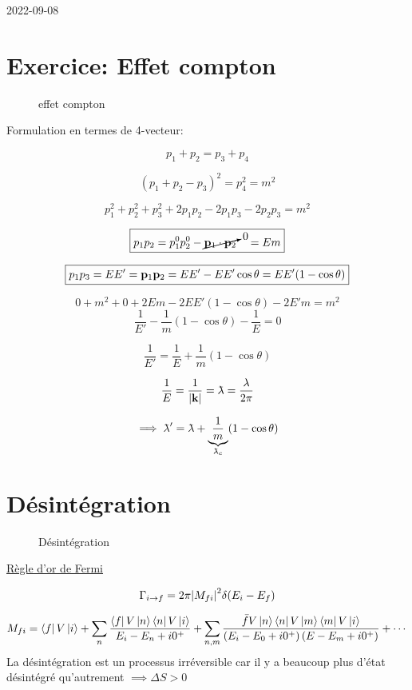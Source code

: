 


2022-09-08

\section*{Exercice: Effet compton}


\begin{figure}[ht]
    \centering
    \caption{effet compton}
    \label{fig:effet-compton}
\end{figure}



Formulation en termes de 4-vecteur:


$$p_1 + p_2 = p_3 + p_4$$ 


$$\left( p_1 + p_2 - p_3 \right)^2 = p_4^{2}= m^2$$ 

$$p_1^{2}+p_2^{2}+p_3^{2}+ 2p_1 p_2 - 2 p_1 p_3 - 2 p_2 p_3 = m^2$$ 

$$\boxed{p_1 p_2 = p_1^{0}p_2^{0}- \cancelto{0}{\vb{p}_1\cdot \vb{p}_2}\quad= Em}$$ 

$$\boxed{p_1 p_3 = E E' = \vb{p}_1 \vb{p}_2 = EE' - EE'\cos\theta = EE'(1-\cos\theta) }$$ 

$$0 + m^{2} + 0 +2Em - 2EE'(1-\cos\theta) -2 E'm = m^2$$ 
$$\frac{1}{E'} - \frac{1}{m} (1-\cos\theta) - \frac{1}{E} = 0$$ 

$$\frac{1}{E'} = \frac{1}{E} + \frac{1}{m} (1-\cos\theta)$$ 

$$\frac{1}{E} = \frac{1}{\abs{\vb{k}}} = \lambdabar = \frac{\lambda}{2\pi}  $$ 

$$\implies \lambdabar' = \lambdabar + \underbrace{\frac{1}{m}}_{\lambdabar_c}  (1-\cos\theta)$$ 


\section*{Désintégration}


\begin{figure}[ht]
    \centering
    \caption{Désintégration}
    \label{fig:désintégration}
\end{figure}
\pagebreak
\underline{Règle d'or de Fermi}  

$$\Gamma_{i\to f} = 2\pi \abs{M_{fi} }^{2}\delta(E_i-E_f)$$ 


$$M_{fi} = \bra{f}V\ket{i} + \sum_n \frac{\bra{f}V \ket{n}\bra{n}V\ket{i}}{E_i -E_n +i0^+} + \sum_{n,m} \frac{\bar{ f} V \ket{n}\bra{n}V \ket{m}\bra{m}V \ket{i}}{\left( E_{i}-E_0+i0^+ \right)(E-E_m +i0^+)} + \dotsb  $$ 
La désintégration est un processus irréversible car il y a beaucoup plus d'état désintégré qu'autrement $\implies \Delta S > 0$   


